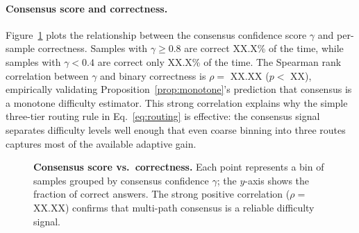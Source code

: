 \paragraph{Consensus score and correctness.}
Figure~\ref{fig:consensus-correct} plots the relationship between the
consensus confidence score $\gamma$ and per-sample correctness.
Samples with $\gamma \geq 0.8$ are correct XX.X\% of the time, while
samples with $\gamma < 0.4$ are correct only XX.X\% of the time.
The Spearman rank correlation between $\gamma$ and binary correctness
is $\rho = $ XX.XX ($p < $ XX), empirically validating
Proposition~\ref{prop:monotone}'s prediction that consensus is a
monotone difficulty estimator.
This strong correlation explains why the simple three-tier routing rule
in Eq.~\eqref{eq:routing} is effective: the consensus signal separates
difficulty levels well enough that even coarse binning into three routes
captures most of the available adaptive gain.

\begin{figure}[t]
\centering
\caption{%
  \textbf{Consensus score vs.\ correctness.}
  Each point represents a bin of samples grouped by consensus confidence
  $\gamma$; the $y$-axis shows the fraction of correct answers.
  The strong positive correlation ($\rho =$ XX.XX) confirms that
  multi-path consensus is a reliable difficulty signal.
}
\label{fig:consensus-correct}
\end{figure}
